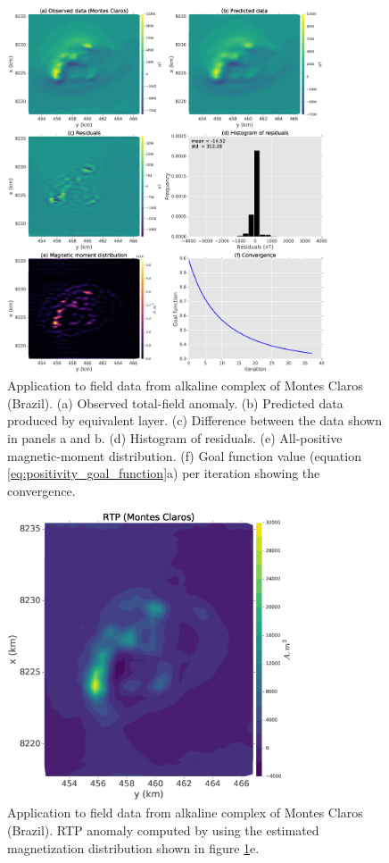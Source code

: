 \begin{figure}
	\centering
	\includegraphics[width=0.85\textwidth]{Fig/field_data_montes_claros/figure5.eps}
	\caption{Application to field data from alkaline complex of Montes Claros (Brazil). (a) Observed total-field anomaly. (b) Predicted data produced by equivalent layer. (c) Difference between the data shown in panels a and b. (d) Histogram of residuals. (e) All-positive magnetic-moment distribution. (f) Goal function value (equation \ref{eq:positivity_goal_function}a) per iteration showing the convergence.}
	\label{fig:mc_data_application}
\end{figure}

\begin{figure}
	\centering
	\includegraphics[width=0.75\textwidth]{Fig/field_data_montes_claros/figure6.eps}
	\caption{Application to field data from alkaline complex of Montes Claros (Brazil). RTP anomaly computed by using the estimated magnetization distribution shown in figure \ref{fig:mc_data_application}e.}
	\label{fig:rtp_mc_data}
\end{figure}

